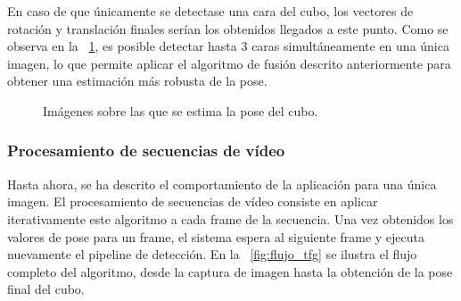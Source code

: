 En caso de que únicamente se detectase una cara del cubo, los vectores de rotación y translación finales serían los obtenidos llegados a este punto. Como se observa en la \figurename~\ref{fig:cubo_detected}, es posible detectar hasta 3 caras simultáneamente en una única imagen, lo que permite aplicar el algoritmo de fusión descrito anteriormente para obtener una estimación más robusta de la pose.

\begin{figure}%
	\centering
	\qquad
	\caption{Imágenes sobre las que se estima la pose del cubo.}%
	\label{fig:cubo_detected}%
\end{figure}

\subsubsection{Procesamiento de secuencias de vídeo}
Hasta ahora, se ha descrito el comportamiento de la aplicación para una única imagen. El procesamiento de secuencias de vídeo consiste en aplicar iterativamente este algoritmo a cada frame de la secuencia. Una vez obtenidos los valores de pose para un frame, el sistema espera al siguiente frame y ejecuta nuevamente el pipeline de detección. En la \figurename~\ref{fig:flujo_tfg} se ilustra el flujo completo del algoritmo, desde la captura de imagen hasta la obtención de la pose final del cubo.

